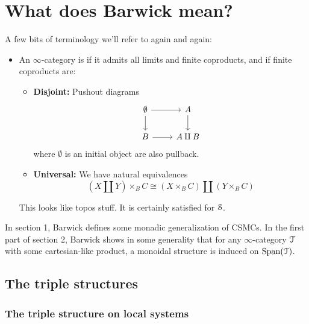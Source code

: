 \documentclass[main.tex]{subfiles}
\begin{document}
\section{What does Barwick mean?}
\label{sec:what_does_barwick_mean_}

A few bits of terminology we'll refer to again and again:
\begin{itemize}
  \item An $\infty$-category is  if it admits all limits and finite coproducts, and if finite coproducts are:
    \begin{itemize}
      \item \textbf{Disjoint:} Pushout diagrams
        \begin{equation*}
          \begin{tikzcd}
            \emptyset
            \arrow[r]
            \arrow[d]
            & A
            \arrow[d]
            \\
            B
            \arrow[r]
            & A \amalg B
          \end{tikzcd}
        \end{equation*}
        where $\emptyset$ is an initial object are also pullback.

      \item \textbf{Universal:} We have natural equivalences
        \begin{equation*}
          (X \amalg Y) \times_{B} C \cong \left( X \times_{B} C \right) \amalg \left( Y \times_{B} C \right)
        \end{equation*}
    \end{itemize}
    This looks like topos stuff. It is certainly satisfied for $\S$.
\end{itemize}

In section 1, Barwick defines some monadic generalization of CSMCs. In the first part of section 2, Barwick shows in some generality that for any $\infty$-category $\category{T}$ with some cartesian-like product, a monoidal structure is induced on $\Span(\category{T})$.

\subsection{The triple structures}
\label{ssc:the_triple_structures_bare}

\subsubsection{The triple structure on local systems}
\label{sss:the_triple_structure_on_local_systems}
\end{document}
